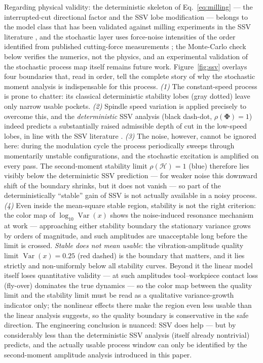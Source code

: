 \documentclass[preprint,12pt]{elsarticle}
\begin{document}
Regarding physical validity: the deterministic skeleton of Eq.~\eqref{eq:milling} --- the interrupted-cut directional factor and the SSV lobe modification --- belongs to the model class that has been validated against milling experiments in the SSV literature \cite{Zatarain2008, Seguy2010}, and the stochastic layer uses force-noise intensities of the order identified from published cutting-force measurements \cite{Fodor2020, Fodor2024_PSD}; the Monte-Carlo check below verifies the numerics, not the physics, and an experimental validation of the stochastic process map itself remains future work. Figure~\ref{fig:ssv} overlays four boundaries that, read in order, tell the complete story of why the stochastic moment analysis is indispensable for this process. \emph{(1)} The constant-speed process is prone to chatter: its classical deterministic stability lobes (gray dotted) leave only narrow usable pockets. \emph{(2)} Spindle speed variation is applied precisely to overcome this, and the \emph{deterministic} SSV analysis (black dash-dot, $\rho(\boldsymbol\Phi)=1$) indeed predicts a substantially raised admissible depth of cut in the low-speed lobes, in line with the SSV literature \cite{Zatarain2008, Seguy2010}. \emph{(3)} The noise, however, cannot be ignored here: during the modulation cycle the process periodically sweeps through momentarily unstable configurations, and the stochastic excitation is amplified on every pass. The second-moment stability limit $\rho(\mathcal{H})=1$ (blue) therefore lies visibly below the deterministic SSV prediction --- for weaker noise this downward shift of the boundary shrinks, but it does not vanish --- so part of the deterministically ``stable'' gain of SSV is not actually available in a noisy process. \emph{(4)} Even inside the mean-square stable region, stability is not the right criterion: the color map of $\log_{10}\operatorname{Var}(x)$ shows the noise-induced resonance mechanism \cite{Sykora2021_MSSP} at work --- approaching either stability boundary the stationary variance grows by orders of magnitude, and such amplitudes are unacceptable long before the limit is crossed. \emph{Stable does not mean usable}: the vibration-amplitude quality limit $\operatorname{Var}(x)=0.25$ (red dashed) is the boundary that matters, and it lies strictly and non-uniformly below all stability curves. Beyond it the linear model itself loses quantitative validity --- at such amplitudes tool--workpiece contact loss (fly-over) dominates the true dynamics --- so the color map between the quality limit and the stability limit must be read as a qualitative variance-growth indicator only; the nonlinear effects there make the region even less usable than the linear analysis suggests, so the quality boundary is conservative in the safe direction. The engineering conclusion is nuanced: SSV does help --- but by considerably less than the deterministic SSV analysis (itself already nontrivial) predicts, and the actually usable process window can only be identified by the second-moment amplitude analysis introduced in this paper.
\end{document}
